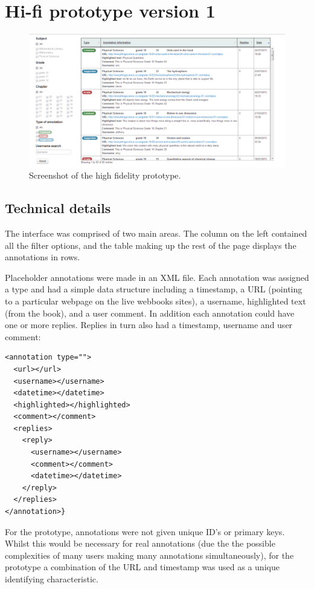 \section{Hi-fi prototype version 1}
\begin{figure}[h!]
    \centering
    \includegraphics[width=\textwidth]{Figures/V1/HiFi1mainview.PNG}
 \caption{Screenshot of the high fidelity prototype.	}
 \label{fig:HifiMain}
\end{figure}

\subsection{Technical details}
The interface was comprised of two main areas. The column on the left contained all the filter options, and the table making up the rest of the page displays the annotations in rows.

Placeholder annotations were made in an XML file. Each annotation was assigned a type and had a simple data structure including a timestamp, a URL (pointing to a particular webpage on the live webbooks sites), a username, highlighted text (from the book), and a user comment. In addition each annotation could have one or more replies. Replies in turn also had a timestamp, username and user comment: 
\begin{verbatim}
<annotation type="">
  <url></url>
  <username></username>
  <datetime></datetime>
  <highlighted></highlighted>
  <comment></comment>
  <replies>
    <reply>
      <username></username>
      <comment></comment>
      <datetime></datetime>
    </reply>
  </replies>
</annotation>}
\end{verbatim}

For the prototype, annotations were not given unique ID's or primary keys. Whilst this would be necessary for real annotations (due the the possible complexities of many users making many annotations simultaneously), for the prototype a combination of the URL and timestamp was used as a unique identifying characteristic. 

